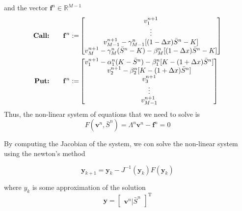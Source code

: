 and the vector $\mathbf{f}^{n} \in \mathbb{R}^{M-1}$
\begin{subequations}
  \begin{align}
    \text{\textbf{Call:}} \qquad \mathbf{f}^n :=& \begin{bmatrix}
      v^{n+1}_{1} \\
      \vdots \\
      v^{n+1}_{M-1} - \gamma^{n}_{M-1}[(1-\Delta{x})\bar{S}^{n} - K] \\
      v^{n+1}_{M} - \gamma^{n}_{M}(\bar{S}^n - K) - \beta^{n}_{M}[(1-\Delta{x})\bar{S}^{n} - K]
    \end{bmatrix}\\
    \text{\textbf{Put:}} \qquad \mathbf{f}^n :=& \begin{bmatrix}
      v^{n+1}_{1} - \alpha^{n}_{1}(K - \bar{S}^{n}) - \beta^{n}_{1}[K - (1+\Delta{x})\bar{S}^{n}] \\
      v^{n+1}_{2} - \beta^{n}_2[K - (1+\Delta{x})\bar{S}^{n}] \\
      v^{n+1}_{3} \\
      \vdots \\
      v^{n+1}_{M-1}
    \end{bmatrix}
  \end{align}
\end{subequations}
Thus, the non-linear system of equations that we need to solve is
\begin{equation}
  F(\mathbf{v}^{n}, \bar{S}^{n}) = \Lambda^{n}\mathbf{v}^{n} - \mathbf{f}^n = 0
\end{equation}

By computing the Jacobian of the system, we con solve the non-linear system 
using the newton's method

\begin{equation}
  \mathbf{y}_{k+1} = \mathbf{y}_{k} - J^{-1}(\mathbf{y}_{k})F(\mathbf{y}_{k})
\end{equation}

where $y_k$ is some approximation of the solution
\begin{equation}
  \mathbf{y} = \begin{bmatrix}
    \mathbf{v}^{n} | \bar{S}^{n}
  \end{bmatrix}^{\text{T}}
\end{equation}

